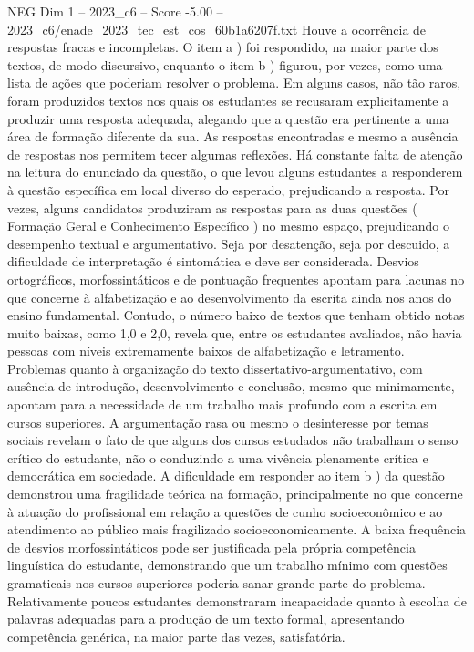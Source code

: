 \begin{textsample}{NEG Dim 1 – 2023\_c6 – Score -5.00 – 2023\_c6/enade\_2023\_tec\_est\_cos\_60b1a6207f.txt}
Houve a ocorrência de respostas fracas e incompletas.
O item a ) foi respondido, na maior parte dos textos, de modo discursivo, enquanto o item b ) figurou, por vezes, como uma lista de ações que poderiam resolver o problema.
Em alguns casos, não tão raros, foram produzidos textos nos quais os estudantes se recusaram explicitamente a produzir uma resposta adequada, alegando que a questão era pertinente a uma área de formação diferente da sua.
As respostas encontradas e mesmo a ausência de respostas nos permitem tecer algumas reflexões.
Há constante falta de atenção na leitura do enunciado da questão, o que levou alguns estudantes a responderem à questão específica em local diverso do esperado, prejudicando a resposta.
Por vezes, alguns candidatos produziram as respostas para as duas questões ( Formação Geral e Conhecimento Específico ) no mesmo espaço, prejudicando o desempenho textual e argumentativo.
Seja por desatenção, seja por descuido, a dificuldade de interpretação é sintomática e deve ser considerada.
Desvios ortográficos, morfossintáticos e de pontuação frequentes apontam para lacunas no que concerne à alfabetização e ao desenvolvimento da escrita ainda nos anos do ensino fundamental.
Contudo, o número baixo de textos que tenham obtido notas muito baixas, como 1,0 e 2,0, revela que, entre os estudantes avaliados, não havia pessoas com níveis extremamente baixos de alfabetização e letramento.
Problemas quanto à organização do texto dissertativo-argumentativo, com ausência de introdução, desenvolvimento e conclusão, mesmo que minimamente, apontam para a necessidade de um trabalho mais profundo com a escrita em cursos superiores.
A argumentação rasa ou mesmo o desinteresse por temas sociais revelam o fato de que alguns dos cursos estudados não trabalham o senso crítico do estudante, não o conduzindo a uma vivência plenamente crítica e democrática em sociedade.
A dificuldade em responder ao item b ) da questão demonstrou uma fragilidade teórica na formação, principalmente no que concerne à atuação do profissional em relação a questões de cunho socioeconômico e ao atendimento ao público mais fragilizado socioeconomicamente.
A baixa frequência de desvios morfossintáticos pode ser justificada pela própria competência linguística do estudante, demonstrando que um trabalho mínimo com questões gramaticais nos cursos superiores poderia sanar grande parte do problema.
Relativamente poucos estudantes demonstraram incapacidade quanto à escolha de palavras adequadas para a produção de um texto formal, apresentando competência genérica, na maior parte das vezes, satisfatória.

\end{textsample}
